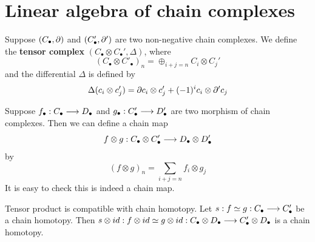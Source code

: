 \documentclass[11pt]{book} %
\begin{document}
\section{Linear algebra of chain complexes}
\begin{definition}
Suppose $(C_\bullet,{\partial})$ and $(C'_\bullet,{\partial}')$ are two non-negative chain complexes. We define the  \textbf{tensor complex} $(C_\bullet\otimes C_\bullet',\Delta)$, where
$$
(C_\bullet\otimes C'_\bullet)_n=\oplus_{i+j=n}C_i\otimes C_j'
$$
and the differential $\Delta$ is defined by 
$$
\Delta(c_i\otimes c'_j)={\partial} c_i\otimes c'_j+(-1)^{i}c_i\otimes {\partial}' c_j
$$
\end{definition}
\begin{definition}
Suppose $f_\bullet:C_\bullet\longrightarrow D_\bullet$ and $g_\bullet: C'_\bullet\longrightarrow D'_\bullet$ are two morphism of chain complexes. Then we can define a chain map
$$
f\otimes g: C_\bullet\otimes C_\bullet'\longrightarrow D_\bullet\otimes D_\bullet'
$$
by 
$$
(f\otimes g)_n=\sum_{i+j=n}f_i\otimes g_j
$$
It is easy to check this is indeed a chain map.
\end{definition}
\begin{exr}
Tensor product is compatible with chain homotopy. Let $s:  f \simeq g: C_\bullet\longrightarrow C_\bullet'$  be a chain homotopy. Then $s\otimes id :f\otimes id  \simeq g \otimes id : C_\bullet\otimes D_\bullet \longrightarrow C_\bullet' \otimes D_\bullet$ is a chain homotopy.
\end{exr}
\end{document}
